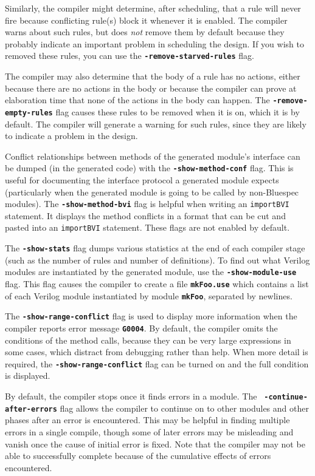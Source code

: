 \documentclass{article}
\newcommand{\te}[1]{\texttt{#1}}
\begin{document}
Similarly, the compiler might determine, after scheduling, that a
rule will never fire because conflicting rule(s) block it whenever
it is enabled. The compiler warns about such rules, but does \emph{not}
remove them by default because they probably indicate an important
problem in scheduling the design. If you wish to removed these rules,
you can use the {\bf\tt -remove-starved-rules} flag.

The compiler may also determine that the body of a rule has no
actions, either because there are no actions in the body  or because
the compiler can prove at elaboration time that none of the actions in
the body can happen.   The {\bf\tt -remove-empty-rules}
flag causes these rules to be removed when it is on, which it is by
default.  The compiler will generate a
warning for such rules, since they are likely to indicate a problem in
the design.

Conflict relationships between methods of the generated module's
interface can be dumped (in the generated code) with the
{\bf\tt -show-method-conf} flag. This is
useful for documenting the interface protocol a generated module
expects (particularly when the generated module is going to be called
by non-Bluespec modules).  The {\bf\tt -show-method-bvi} flag is
helpful when writing an \te{importBVI} statement.  It displays the
method conflicts in a format that can be cut and pasted into an
\te{importBVI} statement.  These flags are not enabled by default.


The {\bf\tt -show-stats} flag dumps various
statistics at the end of each compiler stage (such as the number of
rules and number of definitions).  To find out what Verilog modules
are instantiated by the generated module, use the {\bf\tt -show-module-use}
flag.  This flag causes the compiler to create a file {\bf\tt mkFoo.use}
which contains a list of each Verilog module instantiated by module
{\bf\tt mkFoo}, separated by newlines.

The {\bf\tt -show-range-conflict} flag is used to display more
information when the compiler reports error message {\bf\tt G0004}.
By default, the compiler omits the conditions of the method calls,
because they can be very large expressions in some cases, which
distract from debugging rather than help.  When more detail is
required, the {\bf\tt -show-range-conflict} flag can be turned on and
the full condition is displayed.

By default, the compiler stops once it finds errors in a module.  The {\bf\tt
-continue-after-errors} flag  allows the compiler to continue on to
other modules and other phases after
an error is encountered.  This may be helpful in finding multiple errors in
a single compile, though some of later  errors
may be misleading and vanish once the cause of initial error is fixed.  Note
that  the compiler may not be able to successfully complete
because of the cumulative effects of  errors encountered.
\end{document}
